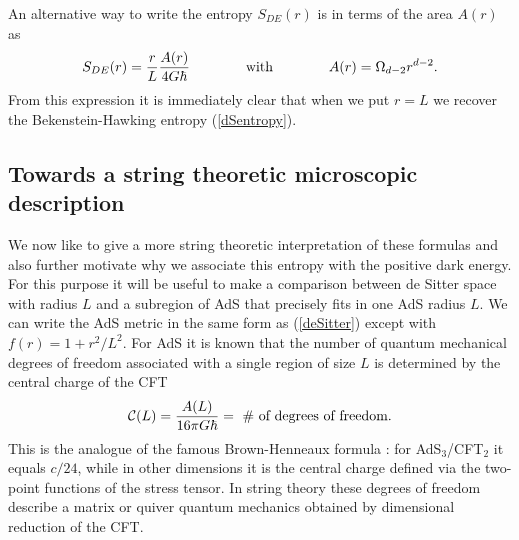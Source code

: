 \documentclass[a4paper,12pt]{article}
\newcommand{\be}{\begin{equation}}
\newcommand{\ee}{\end{equation}}
\begin{document}
An alternative way to write the entropy $S_{DE}(r)$ is in terms of the area $A(r)$ as\\[-2mm]
\begin{equation}
\label{Svol}
S_{DE}(r) %
= 
{r\over L} {A(r)\over 4G\hbar}  \qquad \qquad \mbox{with} \qquad\qquad  A(r) = \Omega_{d-2} r^{d-2}  . 	
\end{equation}
From this expression it is immediately clear that when we put $r=L$ we recover the Bekenstein-Hawking entropy (\ref{dSentropy}). 



 



\subsection{Towards a string theoretic microscopic description} 

\label{subsec:towardsstring}

We now like to give a more string theoretic interpretation of these formulas and also further motivate why we associate this entropy with the positive dark energy.  For this purpose it will be useful to make a comparison between de Sitter space with radius $L$ and a subregion of AdS that precisely fits in one AdS radius $L$.  
We can write the AdS metric in the same form as (\ref{deSitter})
except with $f(r) =1+ r^2/L^2.$
For AdS it is known \cite{AdS-CFT,  SusskindWitten} that the number of quantum 
mechanical degrees of freedom associated with a single region of size $L$ is determined by the central charge of the CFT  %
\be
{\cal C}(L) = {A(L)\over 16\pi G\hbar} = \ \mbox{\# of degrees of freedom}.
\ee
This is the analogue of the famous Brown-Henneaux formula 
\cite{Brown-Henneaux}: for AdS$_3$/CFT$_2$ it equals $c/24$, while in other dimensions it is 
the central charge defined via the two-point functions of the stress tensor. In string theory these degrees of freedom describe a matrix or quiver quantum mechanics 
obtained by dimensional reduction of the CFT. 
\end{document}
